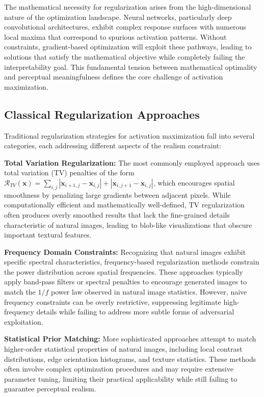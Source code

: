 The mathematical necessity for regularization arises from the high-dimensional nature of the optimization landscape. Neural networks, particularly deep convolutional architectures, exhibit complex response surfaces with numerous local maxima that correspond to spurious activation patterns. Without constraints, gradient-based optimization will exploit these pathways, leading to solutions that satisfy the mathematical objective while completely failing the interpretability goal. This fundamental tension between mathematical optimality and perceptual meaningfulness defines the core challenge of activation maximization.

\subsection{Classical Regularization Approaches}

Traditional regularization strategies for activation maximization fall into several categories, each addressing different aspects of the realism constraint:

\textbf{Total Variation Regularization:} The most commonly employed approach uses total variation (TV) penalties of the form $\mathcal{R}_{TV}(\mathbf{x}) = \sum_{i,j} |\mathbf{x}_{i+1,j} - \mathbf{x}_{i,j}| + |\mathbf{x}_{i,j+1} - \mathbf{x}_{i,j}|$, which encourages spatial smoothness by penalizing large gradients between adjacent pixels. While computationally efficient and mathematically well-defined, TV regularization often produces overly smoothed results that lack the fine-grained details characteristic of natural images, leading to blob-like visualizations that obscure important textural features.

\textbf{Frequency Domain Constraints:} Recognizing that natural images exhibit specific spectral characteristics, frequency-based regularization methods constrain the power distribution across spatial frequencies. These approaches typically apply band-pass filters or spectral penalties to encourage generated images to match the $1/f$ power law observed in natural image statistics. However, naive frequency constraints can be overly restrictive, suppressing legitimate high-frequency details while failing to address more subtle forms of adversarial exploitation.

\textbf{Statistical Prior Matching:} More sophisticated approaches attempt to match higher-order statistical properties of natural images, including local contrast distributions, edge orientation histograms, and texture statistics. These methods often involve complex optimization procedures and may require extensive parameter tuning, limiting their practical applicability while still failing to guarantee perceptual realism.

